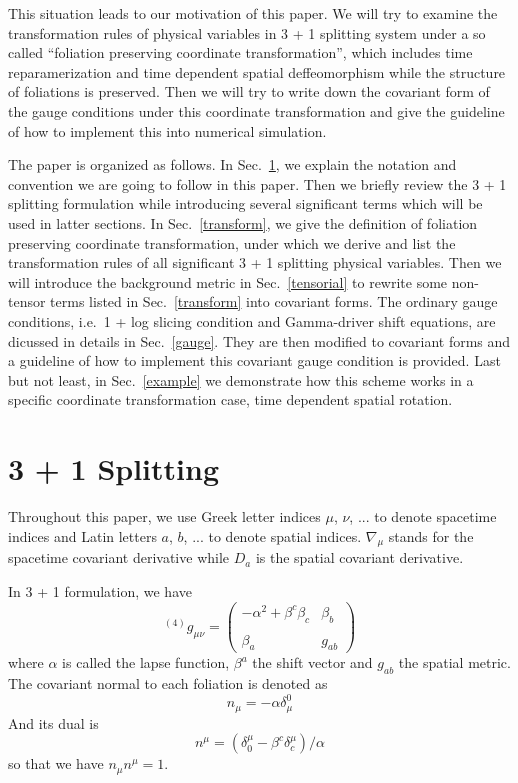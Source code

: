 \documentclass[letterpaper,nofootinbib,prd,amsmath,onecolumn]{revtex4-1}
\begin{document}
This situation leads to our motivation of this paper. We will try to examine the transformation rules of physical variables in 3 + 1 splitting system under a so called ``foliation preserving coordinate transformation'', which includes time reparamerization and time dependent spatial deffeomorphism while the structure of foliations is preserved. Then we will try to write down the covariant form of the gauge conditions under this coordinate transformation and give the guideline of how to implement this into numerical simulation. 

The paper is organized as follows. In Sec.~\ref{3+1}, we explain the notation and convention we are going to follow in this paper. Then we briefly review the 3 + 1 splitting formulation while introducing several significant terms which will be used in latter sections. In Sec.~\ref{transform}, we give the definition of foliation preserving coordinate transformation, under which we derive and list the transformation rules of all significant 3 + 1 splitting physical variables. Then we will introduce the background metric in Sec.~\ref{tensorial} to rewrite some non-tensor terms listed in Sec.~\ref{transform} into covariant forms. The ordinary gauge conditions, i.e.~1 + log slicing condition and Gamma-driver shift equations, are dicussed in details in Sec.~\ref{gauge}. They are then modified to covariant forms and a guideline of how to implement this covariant gauge condition is provided. Last but not least, in Sec.~\ref{example} we demonstrate how this scheme works in a specific coordinate transformation case, time dependent spatial rotation.
\section{3 + 1 Splitting}\label{3+1}
Throughout this paper, we use Greek letter indices $\mu$, $\nu$, ... to denote spacetime indices and Latin letters $a$, $b$, ... to denote spatial indices. $\nabla_{\mu}$ stands for the spacetime covariant derivative while $D_{a}$ is the spatial covariant derivative.

In 3 + 1 formulation, we have
\begin{equation*}
^{(4)}g_{\mu\nu} = \begin{pmatrix}-\alpha^2 + \beta^{c}\beta_{c} & \beta_{b}\\\\\beta_{a} & g_{ab}\end{pmatrix}
\end{equation*}
where $\alpha$ is called the lapse function, $\beta^{a}$ the shift vector and $g_{ab}$ the spatial metric. The covariant normal to each foliation is denoted as
\begin{equation}\label{normal covector}
n_{\mu} = -\alpha\delta^{0}_{\mu}
\end{equation}
 And its dual is
\begin{equation}\label{normal vector}
n^{\mu} = (\delta^{\mu}_{0} - \beta^{c}\delta^{\mu}_{c})/\alpha
\end{equation}
so that we have $n_{\mu}n^{\mu} = 1$. 
\end{document}
